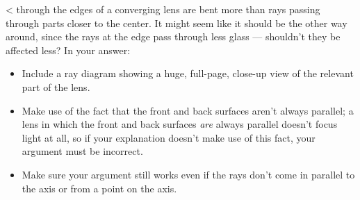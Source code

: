 <%
through the edges of a converging lens are bent more than
rays passing through parts closer to the center. It might
seem like it should be the other way around, since the rays
at the edge pass through less glass --- shouldn't
they be affected less? In your answer:
\begin{itemize}
\item Include a ray diagram showing a huge, full-page, close-up view of the relevant part of the
lens.
\item Make use of the fact that the front and back surfaces aren't always parallel; a lens in
which the front and back surfaces \emph{are} always parallel doesn't focus light at all, so
if your explanation doesn't make use of this fact, your argument must be incorrect.
\item Make sure your argument still works even if the rays don't come in parallel to
the axis or from a point on the axis.
\end{itemize}
